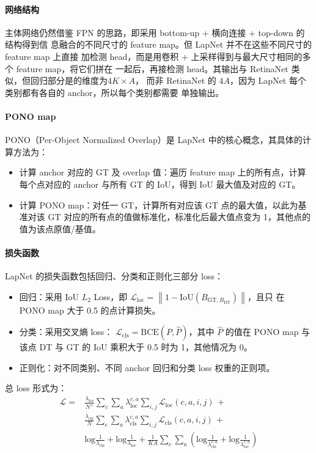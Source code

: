\paragraph{网络结构}
主体网络仍然借鉴 FPN 的思路，即采用 bottom-up + 横向连接 + top-down 的结构得到信
息融合的不同尺寸的 feature map。但 LapNet 并不在这些不同尺寸的feature map 上直接
加检测 head，而是用卷积 + 上采样得到与最大尺寸相同的多个 feature map，将它们拼在
一起后，再接检测 head。其输出与 RetinaNet 类似，但回归部分是的维度为$4 K \times A$，
而非 RetinaNet 的 $4A$，因为 LapNet 每个类别都有各自的 anchor，所以每个类别都需要
单独输出。

\paragraph{PONO map}
PONO（Per-Object Normalized Overlap）是 LapNet 中的核心概念，其具体的计算方法为：

\begin{itemize}
  \item 计算 anchor 对应的 GT 及 overlap 值：遍历 feature map 上的所有点，计算
    每个点对应的 anchor 与所有 GT 的 IoU，得到 IoU 最大值及对应的 GT。
  \item 计算 PONO map：对任一 GT，计算所有对应该 GT 点的最大值，以此为基准对该 GT
    对应的所有点的值做标准化，标准化后最大值点变为 1，其他点的值为该点原值/基值。
\end{itemize}

\paragraph{损失函数}
LapNet 的损失函数包括回归、分类和正则化三部分 loss：

\begin{itemize}
  \item 回归：采用 IoU $L_2$ Loss，即 $\mathcal{L}_{\mathrm{loc}} =
    \left \| 1 - \mathrm{IoU}(B_{\mathrm{GT}, B_{\mathrm{DT}}}) \right\|$，且只
    在 PONO map 大于 0.5 的点计算损失。
  \item 分类：采用交叉熵 loss：
    $\mathcal{L}_{\mathrm{cls}}=\mathrm{BCE}(P, \hat{P})$，其中 $\hat{P}$ 的值在
    PONO map 与该点 DT 与 GT 的 IoU 乘积大于 0.5 时为 1，其他情况为 0。
  \item 正则化：对不同类别、不同 anchor 回归和分类 loss 权重的正则项。
\end{itemize}

总 loss 形式为：
\begin{align}
  \mathcal{L} = & \frac{\lambda_{\mathrm{loc}}}{N^+}\sum_c \sum_a \lambda_{\mathrm{loc}}^{c,a} \sum_{i, j}\mathcal{L}_{\mathrm{loc}}(c,a,i,j) \, + \\
                & \frac{\lambda_{\mathrm{cls}}}{N}\sum_c \sum_a \lambda_{\mathrm{cls}}^{c,a} \sum_{i, j}\mathcal{L}_{\mathrm{cls}}(c,a,i,j) \, + \\
                & \mathrm{log}\frac{1}{\lambda_{\mathrm{cls}}} + \mathrm{log}\frac{1}{\lambda_{\mathrm{loc}}} + \frac{1}{KA}\sum_{c}\sum_{a}\left( \mathrm{log}\frac{1}{\lambda_{\mathrm{cls}}^{c,a}} + \mathrm{log}\frac{1}{\lambda_{\mathrm{loc}}^{c,a}} \right)
\end{align}

